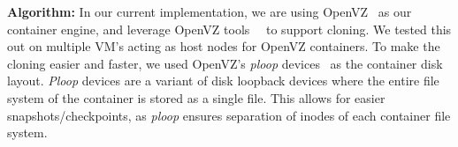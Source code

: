 


\noindent
\textbf{Algorithm:} 
In our current implementation, we are using OpenVZ~\cite{openvz} as our container engine, and leverage OpenVZ tools~\cite{vzctl}~\cite{mirkin2008containers} to support cloning.
We tested this out on multiple VM's acting as host nodes for OpenVZ containers. 
To make the cloning easier and faster, we used OpenVZ's \textit{ploop} devices~\cite{ploop} as the container disk layout. 
\textit{Ploop} devices are a variant of disk loopback devices where the entire file system of the container is stored as a single file. 
This allows for easier snapshots/checkpoints, as \textit{ploop} ensures separation of inodes of each container file system.

